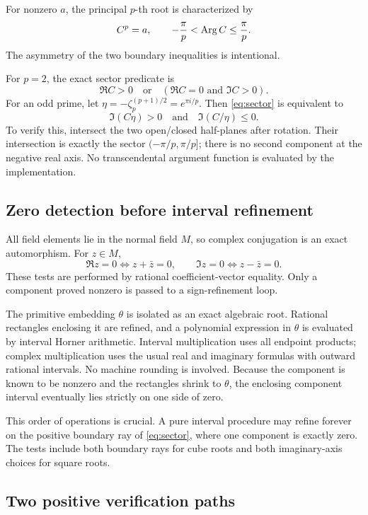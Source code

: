 \documentclass[11pt,letterpaper]{article}
\theoremstyle{definition}\newtheorem{definition}[theorem]{Definition}
\theoremstyle{remark}\newtheorem{remark}[theorem]{Remark}
\begin{document}
For nonzero \(a\), the principal \(p\)-th root is characterized by
\begin{equation}
 C^p=a,\qquad -\frac\pi p<\operatorname{Arg} C\le\frac\pi p.\label{eq:sector}
\end{equation}
The asymmetry of the two boundary inequalities is intentional.

For \(p=2\), the exact sector predicate is
\[
 \Re C>0\quad\text{or}\quad(\Re C=0\text{ and }\Im C>0).
\]
For an odd prime, let
\(\eta=-\zeta_p^{(p+1)/2}=e^{\pi i/p}\). Then \eqref{eq:sector} is equivalent to
\begin{equation}
 \Im(C\eta)>0\quad\text{and}\quad\Im(C/\eta)\le0.\label{eq:sectoralgebraic}
\end{equation}
To verify this, intersect the two open/closed half-planes after rotation.
Their intersection is exactly the sector \((-\pi/p,\pi/p]\); there is no
second component at the negative real axis. No transcendental argument
function is evaluated by the implementation.

\subsection{Zero detection before interval refinement}
All field elements lie in the normal field \(M\), so complex conjugation is
an exact automorphism. For \(z\in M\),
\[
 \Re z=0\iff z+\bar z=0,\qquad
 \Im z=0\iff z-\bar z=0.
\]
These tests are performed by rational coefficient-vector equality. Only a
component proved nonzero is passed to a sign-refinement loop.

The primitive embedding \(\theta\) is isolated as an exact algebraic root.
Rational rectangles enclosing it are refined, and a polynomial expression in
\(\theta\) is evaluated by interval Horner arithmetic. Interval multiplication
uses all endpoint products; complex multiplication uses the usual real and
imaginary formulas with outward rational intervals. No machine rounding is
involved. Because the component is known to be nonzero and the rectangles
shrink to \(\theta\), the enclosing component interval eventually lies
strictly on one side of zero.

This order of operations is crucial. A pure interval procedure may refine
forever on the positive boundary ray of \eqref{eq:sector}, where one component
is exactly zero. The tests include both boundary rays for cube roots and
both imaginary-axis choices for square roots.

\subsection{Two positive verification paths}
\end{document}
